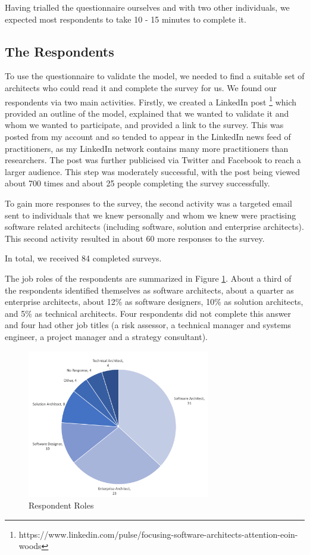 Having trialled the questionnaire ourselves and with two other individuals, we expected most respondents to take 10 - 15 minutes to complete it.

\subsection{The Respondents}

To use the questionnaire to validate the model, we needed to find a suitable set of architects who could read it and complete the survey for us.  We found our respondents via two main activities.  
Firstly, we created a LinkedIn post \footnote{https://www.linkedin.com/pulse/focusing-software-architects-attention-eoin-woods} which provided an outline of the model, explained that we wanted to validate it and whom we wanted to participate, and provided a link to the survey.  This was posted from my account and so tended to appear in the LinkedIn news feed of practitioners, as my LinkedIn network contains many more practitioners than researchers.  The post was further publicised via Twitter and Facebook to reach a larger audience.  This step was moderately successful, with the post being viewed about 700 times and about 25 people completing the survey successfully.

To gain more responses to the survey, the second activity was a targeted email sent to individuals that we knew personally and whom we knew were practising software related architects (including software, solution and enterprise architects).  This second activity resulted in about 60 more responses to the survey.

In total, we received 84 completed surveys.

The job roles of the respondents are summarized in Figure \ref{figure:resproles}.  About a third of the respondents identified themselves as software architects, about a quarter as enterprise architects, about 12\% as software designers, 10\% as solution architects, and 5\% as technical architects.  Four respondents did not complete this answer and four had other job titles (a risk assessor, a technical manager and systems engineer, a project manager and a strategy consultant).

\begin{figure}
\centering
\includegraphics[width=8cm,trim={2 2 2 2},clip]{Figures/prioritisation-detailed-roles}
\caption{Respondent Roles}
\label{figure:resproles}
\end{figure}



